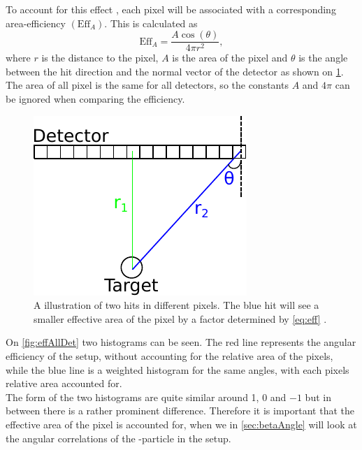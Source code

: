 To account for this effect , each pixel will be associated with a corresponding area-efficiency $(\text{Eff}_A)$.
This is calculated as 
\begin{equation}
\text{Eff}_A = \dfrac{A\cos(\theta) }{ 4 \pi r^2},
\label{eq:eff}
\end{equation}
where $r$ is the distance to the pixel, $A$ is the area of the pixel and $\theta$ is the angle between the hit direction and the normal vector of the detector as shown on \cref{fig:EffGeometry}. The area of all pixel is the same for all detectors, so the constants $A$ and $4\pi$ can be ignored when comparing the efficiency. 


\begin{figure}[h]
	\centering
	\includegraphics[width=.7\linewidth]{../figures/detektorEffDrawingv2.pdf}
	\caption{A illustration of two hits in different pixels. The blue hit will see a smaller effective area of the pixel by a factor determined by \cref{eq:eff} . }
	\label{fig:EffGeometry}
\end{figure}

On \cref{fig:effAllDet} two histograms can be seen. The red line represents the angular efficiency of the setup, without accounting for the relative area of the pixels, while the blue line is a weighted histogram for the same angles, with each pixels relative area accounted for. \\
The form of the two histograms are quite similar around 1, 0 and $-1$ but in between there is a rather prominent difference. Therefore it is important that the effective area of the pixel is accounted for, when we in \cref{sec:betaAngle} will look at the angular correlations of the \be-particle in the setup. 



